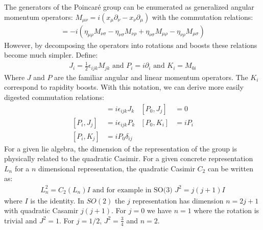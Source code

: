 The generators of the Poincar\'e group can be enumerated as generalized angular momentum operators:
$M_{\mu\nu} = i(x_\mu \partial_\nu - x_\nu \partial_\mu)$ with the commutation relations:
\begin{align*}
[M_{\mu\nu}, M_{\rho\sigma}] = -i(\eta_{\mu\rho} M_{\nu \sigma}  - \eta_{\nu \sigma} M_{\nu \rho} + 
\eta_{\nu \sigma} M_{\mu \rho} - \eta_{\nu \rho} M_{\mu \sigma})
\end{align*}
However, by decomposing the operators into rotations and boosts these relations become much simpler. Define:
\begin{align*}
J_i = \frac{1}{2}\epsilon_{ijk} M_{jk} \text{  and   } P_i = i\partial_i \text{  and   } K_i = M_{0i}
\end{align*}
Where $J$ and $P$ are the familiar angular and linear momentum operators. The $K_i$ correspond to rapidity boosts. 
With this notation, we can derive more easily digested commutation relations:
\begin{align*}
[J_i, J_j] &= i \epsilon_{ijk}J_k  & [P_0,J_j] &= 0 \\
[P_i,J_j] &= i \epsilon_{ijk} P_k & [P_0, K_i] &= i P_i \\
[P_i,K_j] &= i P_0 \delta_{ij} & 
\end{align*}
For a given lie algebra, the dimension of the representation of the group is physically related to the 
quadratic Casimir. For a given concrete representation $L_n$ for a $n$ dimensional
representation, the quadratic Casimir $C_2$ can be written as:
\begin{align*}
L_n^2 = C_2(L_n)I  \text{  and for example in SO(3) } J^2 = j(j+1) I
\end{align*}
where $I$ is the identity. In $SO(2)$ the $j$ representation
has dimension $n=2j+1$ with quadratic Casamir $j(j+1)$. For $j=0$ we have $n=1$ 
where the rotation is trivial and $J^2 =1$. For $j=1/2$, $J^2=\frac{3}{4}$ and $n=2$.

